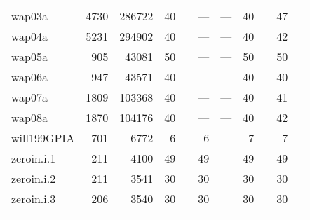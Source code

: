 \begin{longtable}{lrrrlrlrlrl}
  wap03a & 4730 & 286722 & 40 & \cite{Held2011,Malaguti2011} & --- & --- & 40 & \cite{Mendez-Diaz2006} & 47 & \cite{Malaguti2011} \\ 
  wap04a & 5231 & 294902 & 40 & \cite{Held2011,Malaguti2011} & --- & --- & 40 & \cite{Mendez-Diaz2006} & 42 & \cite{Hao2012} \\ 
  wap05a & 905 & 43081 & 50 & \cite{us} & --- & --- & 50 & \cite{Mendez-Diaz2006,Malaguti2011} & 50 & \cite{Malaguti2011,Wu2013a,Brelaz1979,Sewell1996,Segundo2012,Mendez-Diaz2006} \\ 
  wap06a & 947 & 43571 & 40 & \cite{Held2011,Malaguti2011} & --- & --- & 40 & \cite{Mendez-Diaz2006,Held2011} & 40 & \cite{Malaguti2011} \\ 
  wap07a & 1809 & 103368 & 40 & \cite{Held2011,Malaguti2011} & --- & --- & 40 & \cite{Mendez-Diaz2006,Held2011,Malaguti2011} & 41 & \cite{Hao2012} \\ 
  wap08a & 1870 & 104176 & 40 & \cite{Held2011,Malaguti2011} & --- & --- & 40 & \cite{Mendez-Diaz2006,Held2011,Malaguti2011} & 42 & \cite{Malaguti2011} \\ 
  will199GPIA & 701 & 6772 & 6 & \cite{Gualandi2012} & 6 & \cite{Gualandi2012} & 7 & \cite{Mendez-Diaz2006,Malaguti2011,Gualandi2012} & 7 & \cite{Mendez-Diaz2006,Malaguti2011,Gualandi2012,Brelaz1979,Sewell1996,Segundo2012} \\ 
  zeroin.i.1 & 211 & 4100 & 49 & \cite{Gualandi2012} & 49 & \cite{Gualandi2012} & 49 & \cite{Mehrotra1996,Gualandi2012,Malaguti2011,Mendez-Diaz2006} & 49 & \cite{Mehrotra1996,Malaguti2011,Gualandi2012,Brelaz1979,Sewell1996,Segundo2012,Mendez-Diaz2006} \\ 
  zeroin.i.2 & 211 & 3541 & 30 & \cite{Gualandi2012} & 30 & \cite{Gualandi2012} & 30 & \cite{Mehrotra1996,Malaguti2011,Gualandi2012,Mendez-Diaz2006} & 30 & \cite{Mehrotra1996,Malaguti2011,Wu2013a,Gualandi2012,Brelaz1979,Sewell1996,Segundo2012,Mendez-Diaz2006} \\ 
  zeroin.i.3 & 206 & 3540 & 30 & \cite{Gualandi2012} & 30 & \cite{Gualandi2012} & 30 & \cite{Mehrotra1996,Gualandi2012,Malaguti2011,Mendez-Diaz2006} & 30 & \cite{Mehrotra1996,Malaguti2011,Wu2013a,Gualandi2012,Brelaz1979,Sewell1996,Segundo2012,Mendez-Diaz2006} \\ 
   \bottomrule
\label{tab:instances}
\end{longtable}
\endgroup

